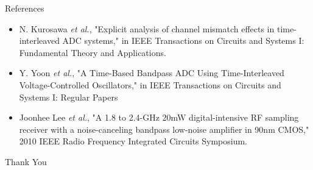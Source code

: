 \documentclass{beamer}
\begin{document}
\begin{frame}{References}
\begin{itemize}
	\item N. Kurosawa \textit{et al.}, "Explicit analysis of channel mismatch effects in time-interleaved ADC systems," in IEEE Transactions on Circuits and Systems I: Fundamental Theory and Applications.
	\item Y. Yoon \textit{et al.}, "A Time-Based Bandpass ADC Using Time-Interleaved Voltage-Controlled Oscillators," in IEEE Transactions on Circuits and Systems I: Regular Papers
	\item Joonhee Lee \textit{et al.}, "A 1.8 to 2.4-GHz 20mW digital-intensive RF sampling receiver with a noise-canceling bandpass low-noise amplifier in 90nm CMOS," 2010 IEEE Radio Frequency Integrated Circuits Symposium.
\end{itemize}
\end{frame}
\begin{frame}{}
\centering
 \Huge
 Thank You
\end{frame}
\end{document}
